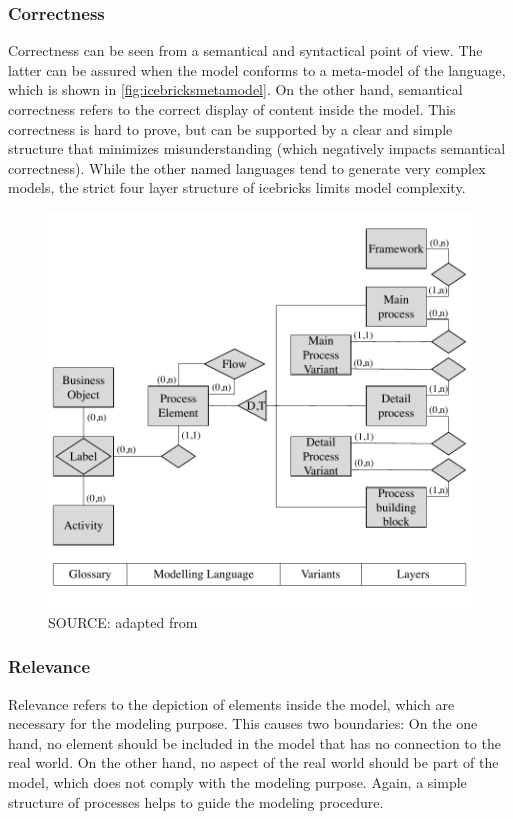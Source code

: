 	 \subsubsection{Correctness}
	 Correctness can be seen from a semantical and syntactical point of view. The latter can be assured when the model conforms to a meta-model of the language, which is shown in \ref{fig:icebricksmetamodel}. On the other hand, semantical correctness refers to the correct display of content inside the model. This correctness is hard to prove, but can be supported by a clear and simple structure that minimizes misunderstanding (which negatively impacts semantical correctness). While the other named languages tend to generate very complex models, the strict four layer structure of icebricks limits model complexity. 
	 
	 	 \begin{figure}[caption={icebricks meta model}, label={fig:icebricksmetamodel}]
	 	{	\includegraphics[width=.8\textwidth]{figures/icebricksmetamodel.pdf}}
	 	\hspace{6.2cm}	SOURCE:  adapted from \citep[]{Puster2015}
	 \end{figure} 
 
	 \subsubsection{Relevance}
	 Relevance refers to the depiction of elements inside the model, which are necessary for the modeling purpose. This causes two boundaries: On the one hand, no element should be included in the model that has no connection to the real world. On the other hand, no aspect of the real world should be part of the model, which does not comply with the modeling purpose. Again, a simple structure of processes helps to guide the modeling procedure. 
	 
